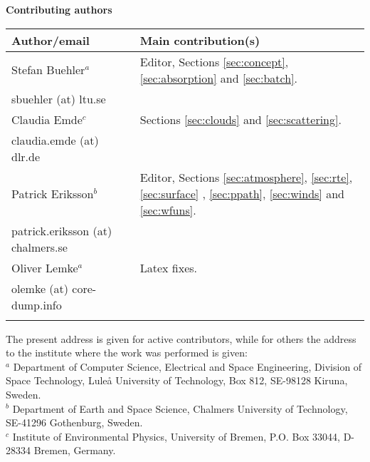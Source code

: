 \documentclass[11pt,twoside,a4paper,fleqn]{book}
\begin{document}
%
\newpage
\thispagestyle{plain}
%
\begin{center}
  {\Large \bf Contributing authors}
\end{center}
\vspace*{10mm}
\begin{tabular}{lp{10mm}l}
  \hline
  {\bf Author/email} & & {\bf Main contribution(s)} \\
  \hline
  Stefan Buehler$^a$ & & Editor, Sections \ref{sec:concept},
  \ref{sec:absorption} and \ref{sec:batch}.\\
  sbuehler (at) ltu.se & &        \\
 \hline
  Claudia Emde$^c$ & & Sections \ref{sec:clouds} and \ref{sec:scattering}.\\
  claudia.emde (at) dlr.de & & \\
  \hline
  Patrick Eriksson$^b$ &  & Editor, 
  Sections \ref{sec:atmosphere}, \ref{sec:rte}, \ref{sec:surface} , 
  \ref{sec:ppath}, \ref{sec:winds} and \ref{sec:wfuns}.\\  
  patrick.eriksson (at) chalmers.se & & \\
  \hline
  Oliver Lemke$^a$ & & Latex fixes.\\
  olemke (at) core-dump.info & & \\
  \hline
 &&\\
\end{tabular}


\noindent
The present address is given for active contributors, while for others
the address to the institute where the work was performed is given:\\
$^a$ Department of Computer Science, Electrical and Space Engineering,
Division of Space Technology, Lule{\aa} University of Technology, Box
812, SE-98128 Kiruna, Sweden. \\
$^b$ Department of Earth and Space Science, Chalmers University of Technology,
SE-41296 Gothenburg, Sweden. \\
$^c$ Institute of Environmental Physics, University of Bremen, P.O. Box 33044, 
D-28334 Bremen, Germany. \\
\end{document}
